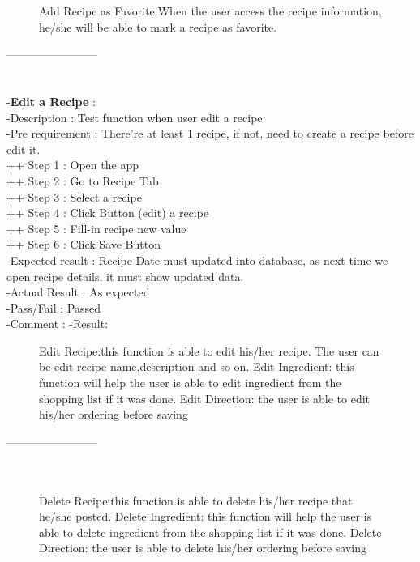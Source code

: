 \documentclass{article}
\begin{document}
    \begin{figure}[h!]
    \centering
    Add Recipe as Favorite:When the user access the recipe information, he/she will be able to mark a recipe as favorite.
    \label{fig:cookingbook}
    \end{figure}
    ------------------------\\ \\ \\

    -\textbf{Edit a Recipe }: \\
    -Description : Test function when user edit a recipe. \\
    -Pre requirement : There're at least 1 recipe, if not, need to create a recipe before edit it. \\
    ++ Step 1 : Open the app  \\
    ++ Step 2 : Go to Recipe Tab \\
    ++ Step 3 : Select a recipe  \\
    ++ Step 4 : Click Button (edit) a recipe \\
    ++ Step 5 : Fill-in recipe new value \\
    ++ Step 6 : Click Save Button \\
    -Expected result : Recipe Date must updated into database, as next time we open recipe details, it must show updated data. \\
    -Actual Result : As expected \\
    -Pass/Fail : Passed \\
    -Comment : 
    -Result:
     \begin{figure}[h!]
    \centering
    Edit Recipe:this function is able to edit his/her recipe. The user can be edit recipe name,description and so on.
    Edit Ingredient: this function will help the user is able to edit ingredient from the shopping list if it was done.
    Edit Direction: the user is able to edit his/her ordering before saving
    \label{fig:cookingbook}
    \end{figure}
    ------------------------\\ \\ \\
    \begin{figure}[h!]
    \centering
    Delete Recipe:this function is able to delete his/her recipe that he/she posted.
    Delete Ingredient: this function will help the user is able to delete ingredient from the shopping list if it was done.
    Delete Direction: the user is able to delete his/her ordering before saving
    \label{fig:cookingbook}
    \end{figure}
\end{document}
